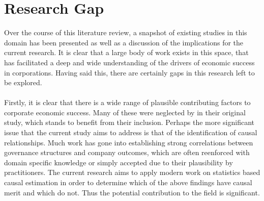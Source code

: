 {\section{Research Gap}
{Over the course of this literature review, a snapshot of existing studies in this domain has been presented as well as a discussion of the implications for the current research. It is clear that a large body of work exists in this space, that has facilitated a deep and wide understanding of the drivers of economic success in corporations. Having said this, there are certainly gaps in this research left to be explored. \\\\
Firstly, it is clear that there is a wide range of plausible contributing factors to corporate economic success. Many of these were neglected by \cite{moldovan2015learning} in their original study, which stands to benefit from their inclusion. Perhaps the more significant issue that the current study aims to address is that of the identification of causal relationships. Much work has gone into establishing strong correlations between governance structures and company outcomes, which are often reenforced with domain specific knowledge or simply accepted due to their plausibility by practitioners. The current research aims to apply modern work on statistics based causal estimation in order to determine which of the above findings have causal merit and which do not. Thus the potential contribution to the field is significant.}}